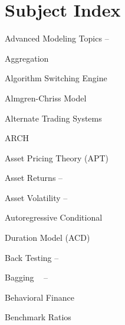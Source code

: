 \chapter*{Subject Index}
\nopagebreak

\setlength\columnsep{0.5cm}
\begin{multicols}{2}
{
\setlength{\parindent}{0em}
\setlength{\parskip}{0em}

Advanced Modeling Topics \hfill \pageref{in:adv_model}--\pageref{in:adv_model_end} \par

Aggregation \hfill \pageref{in:agg} \par

Algorithm Switching Engine \hfill \pageref{in:algo_swit_eng} \par

Almgren-Chriss Model \hfill \pageref{in:alm_chriss} \par

Alternate Trading Systems \hfill \pageref{in:ats} \par

ARCH \hfill \pageref{in:arch} \par

Asset Pricing Theory (APT) \hfill \pageref{in:apt} \par

Asset Returns \hfill \pageref{in:assetret1}--\pageref{in:assetret2} \par

Asset Volatility \hfill \pageref{in:assetvol1}--\pageref{in:assetvol2} \par

Autoregressive Conditional \hfill \pageref{in:acd} \par \hspace{0.25cm} Duration Model (ACD) \pspace





Back Testing \hfill \pageref{in:back1}--\pageref{in:back2} \par

Bagging \hfill  \pageref{in:bagging}--\pageref{in:bagging_end} \par

Behavioral Finance \hfill \pageref{in:behave1} \par

Benchmark Ratios \hfill \pageref{in:benchmark} \par

}
\end{multicols}
